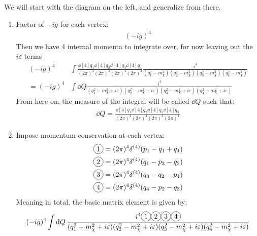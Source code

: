 \documentclass[12pt]{article}
\newcommand{\veps}{\varepsilon}
\newcommand{\circled}[1]{\tikz[baseline=(char.base)]{
    \node[shape=circle,draw,inner sep=2pt](char){#1};}}
\begin{document}
We will start with the diagram on the left, and generalize from there.
\begin{enumerate}
\item Factor of $-ig$ for each vertex:
  \begin{align*}
    (-ig)^4
  \end{align*}
  Then we have 4 internal momenta to integrate over, for now leaving out the $i\veps$ terms
  \begin{align*}
    (-ig)^4&\int\frac{\dd[4]{q_1}\dd[4]{q_2}\dd[4]{q_3}\dd[4]{q_4}}
    {(2\pi)^4(2\pi)^4(2\pi)^4(2\pi)^4}
    \frac{i^4}{(q_1^2-m_\chi^2)(q_2^2-m_\chi^2)(q_3^2-m_\chi^2)(q_4^2-m_\chi^2)}\\
    =(-ig)^4&\int\dd{Q}
    \frac{i^4}{(q_1^2-m_\chi^2+i\veps)(q_2^2-m_\chi^2+i\veps)(q_3^2-m_\chi^2+i\veps)(q_4^2-m_\chi^2+i\veps)}
  \end{align*}
  From here on, the measure of the integral will be called $\dd{Q}$ such that:
  \begin{align*}
    \dd{Q}=\frac{\dd[4]{q_1}\dd[4]{q_2}\dd[4]{q_3}\dd[4]{q_4}}
    {(2\pi)^4(2\pi)^4(2\pi)^4(2\pi)^4}
  \end{align*}
\item Impose momentum conservation at each vertex:
  \begin{align*}
    \circled{1}=(2\pi)^4\delta^{(4)}(p_1-q_1+q_4)\\
    \circled{2}=(2\pi)^4\delta^{(4)}(q_1-p_3-q_2)\\
    \circled{3}=(2\pi)^4\delta^{(4)}(q_3-q_2-p_4)\\
    \circled{4}=(2\pi)^4\delta^{(4)}(q_4-p_2-q_3)
  \end{align*}
  Meaning in total, the basic matrix element is given by:
  \begin{align*}
    (-ig)^4\int\dd{Q}
    \frac{i^4\circled{1}\circled{2}\circled{3}\circled{4}}
    {(q_1^2-m_\chi^2+i\veps)(q_2^2-m_\chi^2+i\veps)(q_3^2-m_\chi^2+i\veps)(q_4^2-m_\chi^2+i\veps)}
  \end{align*}
\end{enumerate}
\end{document}
